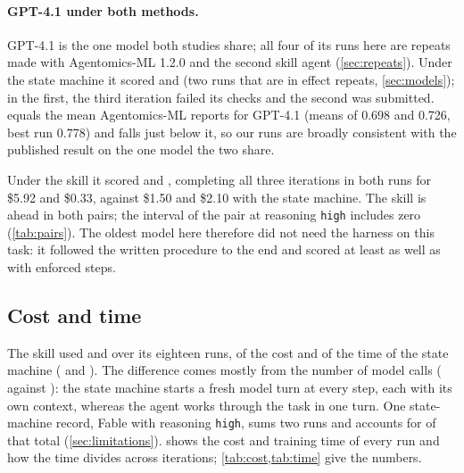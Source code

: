 \paragraph{GPT-4.1 under both methods.} GPT-4.1 is the one model both studies share; all four of its runs here are
repeats made with Agentomics-ML 1.2.0 and the second skill agent (\cref{sec:repeats}). Under the state machine it scored
\GptSmNone{} and \GptSmHigh{} (two runs that are in effect repeats, \cref{sec:models}); in the first, the third iteration
failed its checks and the second was submitted. \GptSmHigh{} equals the mean Agentomics-ML reports for GPT-4.1 (means
of 0.698 and 0.726, best run 0.778) and \GptSmNone{} falls just below it, so our runs are broadly consistent with the
published result on the one model the two share.

Under the skill it scored \GptSkillNone{} and \GptSkillHigh{}, completing all three iterations in both runs for
\$5.92 and \$0.33, against \$1.50 and \$2.10 with the state machine. The skill is ahead in both pairs; the interval
of the pair at reasoning \texttt{high} includes zero (\cref{tab:pairs}). The oldest model here therefore did not need
the harness on this task: it followed the written procedure to the end and scored at least as well as with enforced
steps.

\subsection{Cost and time}\label{sec:cost}

The skill used \SkillCost{} and \SkillTime{} over its eighteen runs, \CostRatio{} of the cost and \TimeRatio{} of the
time of the state machine (\SmCost{} and \SmTime). The difference comes mostly from the number of model calls
(\SkillCalls{} against \SmCalls): the state machine starts a fresh model turn at every step, each with its own context,
whereas the agent works through the task in one turn. One state-machine record, Fable with reasoning \texttt{high},
sums two runs and accounts for \FableSmHighCost{} of that total (\cref{sec:limitations}).  shows the cost and training time of every run and how the time divides across iterations;
\cref{tab:cost,tab:time} give the numbers.

\begin{table}[tbp]\centering\small
\caption{Cost per run in USD, as billed by OpenRouter. Each model's cheapest run is marked in bold; the cheapest overall
is marked bold and underlined.}
\label{tab:cost}
\CostTable
\end{table}

